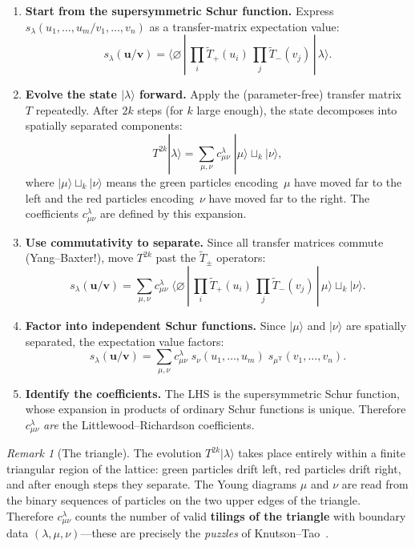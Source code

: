 \documentclass[11pt]{article}
\theoremstyle{plain}
\theoremstyle{definition}
\theoremstyle{remark}
\newtheorem{remark}[theorem]{Remark}
\begin{document}
\begin{enumerate}
\item \textbf{Start from the supersymmetric Schur function.}
  Express $s_\lambda(u_1, \ldots, u_m / v_1, \ldots, v_n)$
  as a transfer-matrix expectation value:
  \[
    s_\lambda(\mathbf{u}/\mathbf{v})
    = \langle \varnothing \,|\,
    \textstyle\prod_i \widetilde{T}_+(u_i)\,
    \prod_j \widetilde{T}_-(v_j)
    \,|\, \lambda \rangle.
  \]

\item \textbf{Evolve the state $|\lambda\rangle$ forward.}
  Apply the (parameter-free) transfer matrix $T$ repeatedly.
  After $2k$ steps (for $k$ large enough), the state
  decomposes into spatially separated components:
  \[
    T^{2k} |\lambda\rangle
    = \sum_{\mu,\nu} c^\lambda_{\mu\nu}\;
    |\mu\rangle \sqcup_k |\nu\rangle,
  \]
  where $|\mu\rangle \sqcup_k |\nu\rangle$ means the green
  particles encoding~$\mu$ have moved far to the left and the
  red particles encoding~$\nu$ have moved far to the right.
  The coefficients $c^\lambda_{\mu\nu}$ are defined by this
  expansion.

\item \textbf{Use commutativity to separate.}
  Since all transfer matrices commute (Yang--Baxter!), move
  $T^{2k}$ past the $\widetilde{T}_\pm$ operators:
  \[
    s_\lambda(\mathbf{u}/\mathbf{v})
    = \sum_{\mu,\nu} c^\lambda_{\mu\nu}\;
    \langle \varnothing \,|\,
    \textstyle\prod_i \widetilde{T}_+(u_i)\,
    \prod_j \widetilde{T}_-(v_j)
    \,|\, \mu \rangle \sqcup_k |\nu\rangle.
  \]

\item \textbf{Factor into independent Schur functions.}
  Since $|\mu\rangle$ and $|\nu\rangle$ are spatially
  separated, the expectation value factors:
  \[
    s_\lambda(\mathbf{u}/\mathbf{v})
    = \sum_{\mu,\nu} c^\lambda_{\mu\nu}\;
    s_\nu(u_1, \ldots, u_m)\;
    s_{\mu^{\mathrm{T}}}(v_1, \ldots, v_n).
  \]

\item \textbf{Identify the coefficients.}
  The LHS is the supersymmetric Schur function, whose expansion
  in products of ordinary Schur functions is unique.
  Therefore $c^\lambda_{\mu\nu}$ \emph{are} the
  Littlewood--Richardson coefficients.
\end{enumerate}

\begin{remark}[The triangle]\label{rem:triangle}
The evolution $T^{2k}|\lambda\rangle$ takes place entirely
within a finite triangular region of the lattice: green particles
drift left, red particles drift right, and after enough steps they
separate.  The Young diagrams $\mu$ and $\nu$ are read from the
binary sequences of particles on the two upper edges of the
triangle.  Therefore $c^\lambda_{\mu\nu}$ counts the number of
valid \textbf{tilings of the triangle} with boundary data
$(\lambda, \mu, \nu)$---these are precisely the
\emph{puzzles} of Knutson--Tao~\cite{knutson-tao-2003}.
\end{remark}
\end{document}
